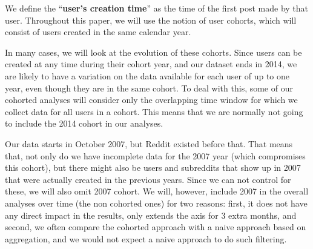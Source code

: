 We define the ``\textbf{user's creation time}'' as the time of the first post made by that user.  Throughout this paper, we will use the notion of user cohorts, which will consist of users created in the same calendar year.

In many cases, we will look at the evolution of these cohorts. Since users can be created at any time during their cohort year, and our dataset ends in 2014, 
we are likely to have a variation on the data available for each user of up to one year, even though they are in the same cohort.  To deal with this, some of our cohorted analyses will consider only the overlapping time window for which we collect data for all users in a cohort.   This means that we are normally not going to include the 2014 cohort in our analyses.

Our data starts in October 2007, but Reddit existed before that. That means that, not only do we have incomplete data for the 2007 year (which compromises this cohort), but there might also be users and subreddits that show up in 2007 that were actually created in the previous years. Since we can not control for these, we will also omit 2007 cohort. We will, however, include 2007 in the overall analyses over time (the non cohorted ones) for two reasons: first, it does not have any direct impact in the results, only extends the axis for 3 extra months, and second, we often compare the cohorted approach with a naive approach based on aggregation, and we would not expect a naive approach to do such filtering. 

